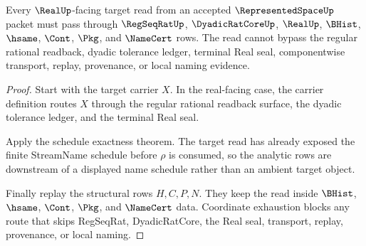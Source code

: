 \begin{theorem}
\label{thm:representedspace-target-seal-nonescape}
Every $\RealUp$-facing target read from an accepted $\RepresentedSpaceUp$ packet must pass through $\RegSeqRatUp$, $\DyadicRatCoreUp$, $\RealUp$, $\BHist$, $\hsame$, $\Cont$, $\Pkg$, and $\NameCert$ rows. The read cannot bypass the regular rational readback, dyadic tolerance ledger, terminal Real seal, componentwise transport, replay, provenance, or local naming evidence.
\end{theorem}
\begin{proof}
Start with the target carrier $X$. In the real-facing case, the carrier definition routes $X$ through the regular rational readback surface, the dyadic tolerance ledger, and the terminal Real seal.

Apply the schedule exactness theorem. The target read has already exposed the finite StreamName schedule before $\rho$ is consumed, so the analytic rows are downstream of a displayed name schedule rather than an ambient target object.

Finally replay the structural rows $H,C,P,N$. They keep the read inside $\BHist$, $\hsame$, $\Cont$, $\Pkg$, and $\NameCert$ data. Coordinate exhaustion blocks any route that skips RegSeqRat, DyadicRatCore, the Real seal, transport, replay, provenance, or local naming.
\end{proof}

